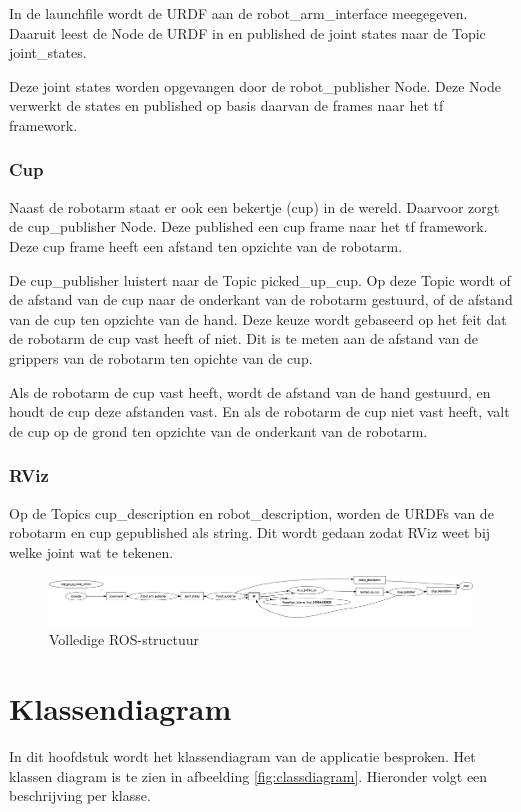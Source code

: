 \documentclass[12pt, legalpaper]{article}
\begin{document}
    In de launchfile wordt de URDF aan de robot\_arm\_interface meegegeven. Daaruit leest de Node de URDF in en published de joint states naar de Topic joint\_states.

    Deze joint states worden opgevangen door de robot\_publisher Node. Deze Node verwerkt de states en published op basis daarvan de frames naar het tf framework.

    \subsubsection{Cup}
    Naast de robotarm staat er ook een bekertje (cup) in de wereld.
    Daarvoor zorgt de cup\_publisher Node. Deze published een cup frame naar het tf framework.
    Deze cup frame heeft een afstand ten opzichte van de robotarm. 
    
    De cup\_publisher luistert naar de Topic picked\_up\_cup. Op deze Topic wordt of de afstand van de cup naar de onderkant van de robotarm gestuurd, of de afstand van de cup ten opzichte van de hand.
    Deze keuze wordt gebaseerd op het feit dat de robotarm de cup vast heeft of niet.
    Dit is te meten aan de afstand van de grippers van de robotarm ten opichte van de cup.
    
    Als de robotarm de cup vast heeft, wordt de afstand van de hand gestuurd, en houdt de cup deze afstanden vast.
    En als de robotarm de cup niet vast heeft, valt de cup op de grond ten opzichte van de onderkant van de robotarm.

    \subsubsection{RViz}
    Op de Topics cup\_description en robot\_description, worden de URDFs van de robotarm en cup gepublished als string.
    Dit wordt gedaan zodat RViz weet bij welke joint wat te tekenen.


    \begin{figure}
        \includegraphics[width=1\textwidth]{rosgraph}
        \caption{Volledige ROS-structuur}
        \label{fig:full-structure}
    \end{figure}

    \newpage

    \section{Klassendiagram}
    In dit hoofdstuk wordt het klassendiagram van de applicatie besproken.
    Het klassen diagram is te zien in afbeelding \cref{fig:classdiagram}.
    Hieronder volgt een beschrijving per klasse.
\end{document}
